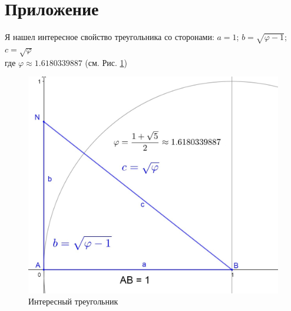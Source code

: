 \documentclass[12pt, letterpaper, oneside]{report}
\begin{document}
\section{Приложение}

Я нашел интересное свойство треугольника со сторонами: $a=1$; $b=\sqrt{\varphi-1}$; $c=\sqrt{\varphi}$\\
где $\varphi\approx 1.6180339887$ (см. Рис. \ref{fig:mytriangle})
\begin{figure}[h]
	\centering
	\includegraphics[width=0.7\linewidth]{images/my_triangle.jpg}
	\caption{Интересный треугольник}
	\label{fig:mytriangle}
\end{figure}
\end{document}
